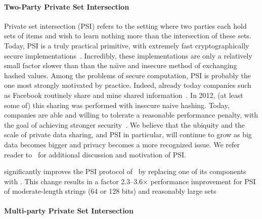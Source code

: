 

\paragraph{Two-Party Private Set Intersection}
Private set intersection (PSI) refers to the setting where two parties each hold sets of items and wish to learn nothing more than the intersection of these sets.
Today, PSI is a truly practical primitive, with extremely fast cryptographically secure implementations~\cite{DBLP:conf/uss/Pinkas0SZ15}. Incredibly, these implementations are only a relatively small factor slower than than the na\"{\i}ve and insecure method of exchanging hashed values.  Among the problems of secure computation, PSI is probably the one most strongly motivated by practice.  Indeed, already today companies such as Facebook  routinely share and mine shared information~\cite{effArticleFacebook,MotisCCStalk2015}.  In 2012, (at least some of) this  sharing was performed with insecure naive hashing.  Today, companies are able and willing to tolerate a reasonable performance penalty, with the goal of achieving stronger security~\cite{MotisCCStalk2015}.  We believe that the ubiquity and the scale of private data sharing, and PSI in particular, will continue to grow as big data becomes bigger and privacy becomes a more recognized issue.  We refer reader to~\cite{DBLP:conf/uss/Pinkas0SZ15,DBLP:conf/uss/Pinkas0Z14} for additional discussion and motivation of PSI.



\cite{CCS:KKRT16} significantly improves the PSI protocol of~\cite{DBLP:conf/uss/Pinkas0SZ15} by replacing one of its components with \batchOPRF. This change results in a factor 2.3--3.6$\times$ performance improvement for PSI of moderate-length strings (64 or 128 bits) and reasonably large sets  

\paragraph{Multi-party Private Set Intersection}
